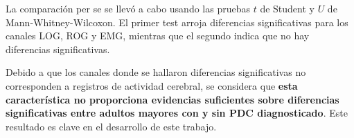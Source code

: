 La comparaci\'on per se se llev\'o a cabo usando las pruebas %
$t$ de Student y $U$ de Mann-Whitney-Wilcoxon.
El primer test arroja diferencias significativas para los canales LOG, ROG y EMG, mientras que
el segundo indica que no hay diferencias significativas. 

Debido a que los canales
donde se hallaron diferencias significativas no corresponden a registros de actividad
cerebral, se considera que \textbf{esta caracter\'istica no proporciona evidencias
suficientes sobre diferencias significativas entre adultos mayores con y sin PDC diagnosticado}.
Este resultado es clave en el desarrollo de este trabajo.

%

